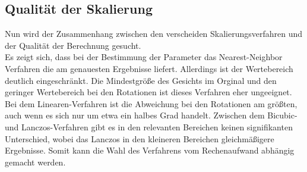 \subsection{Qualität der Skalierung}
Nun wird der Zusammenhang zwischen den verscheiden Skalierungsverfahren und der Qualität der Berechnung gesucht.\\
Es zeigt sich, dass bei der Bestimmung der Parameter das Nearest-Neighbor Verfahren die am genauesten Ergebnisse liefert. Allerdings ist der Wertebereich deutlich eingeschränkt. Die Mindestgröße des Gesichts im Orginal und den geringer Wertebereich bei den Rotationen ist dieses Verfahren eher ungeeignet.\\
Bei dem Linearen-Verfahren ist die Abweichung bei den Rotationen am größten, auch wenn es sich nur um etwa ein halbes Grad handelt. Zwischen dem Bicubic- und Lanczos-Verfahren gibt es in den relevanten Bereichen keinen signifikanten Unterschied, wobei das Lanczos in den kleineren Bereichen gleichmäßigere Ergebnisse. Somit kann die Wahl des Verfahrens vom Rechenaufwand abhängig gemacht werden. 
